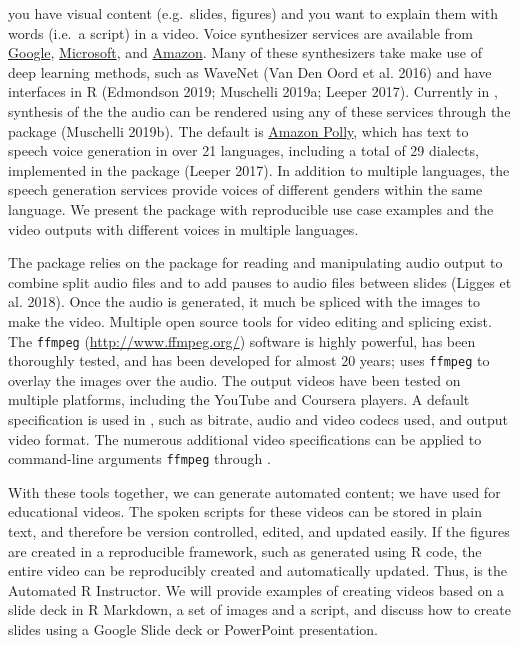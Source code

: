 you have visual content (e.g.~slides, figures) and you want to explain
them with words (i.e.~a script) in a video. Voice synthesizer services
are available from
\href{https://cloud.google.com/text-to-speech/}{Google},
\href{https://azure.microsoft.com/en-us/services/cognitive-services/text-to-speech/}{Microsoft},
and \href{https://aws.amazon.com/polly/}{Amazon}. Many of these
synthesizers take make use of deep learning methods, such as WaveNet
(Van Den Oord et al. 2016) and have interfaces in R (Edmondson 2019;
Muschelli 2019a; Leeper 2017). Currently in , synthesis of the
the audio can be rendered using any of these services through the
 package (Muschelli 2019b). The default is
\href{https://aws.amazon.com/polly/}{Amazon Polly}, which has text to
speech voice generation in over 21 languages, including a total of 29
dialects, implemented in the  package (Leeper 2017).
In addition to multiple languages, the speech generation services
provide voices of different genders within the same language. We present
the  package with reproducible use case examples and the video
outputs with different voices in multiple languages.

The  package relies on the  package for reading
and manipulating audio output to combine split audio files and to add
pauses to audio files between slides (Ligges et al. 2018). Once the
audio is generated, it much be spliced with the images to make the
video. Multiple open source tools for video editing and splicing exist.
The \texttt{ffmpeg} (\url{http://www.ffmpeg.org/}) software is highly
powerful, has been thoroughly tested, and has been developed for almost
20 years;  uses \texttt{ffmpeg} to overlay the images over the
audio. The output videos have been tested on multiple platforms,
including the YouTube and Coursera players. A default specification is
used in , such as bitrate, audio and video codecs used, and
output video format. The numerous additional video specifications can be
applied to command-line arguments \texttt{ffmpeg} through .

With these tools together, we can generate automated content; we have
used  for educational videos. The spoken scripts for these
videos can be stored in plain text, and therefore be version controlled,
edited, and updated easily. If the figures are created in a reproducible
framework, such as generated using R code, the entire video can be
reproducibly created and automatically updated. Thus,  is the
Automated R Instructor. We will provide examples of creating videos
based on a slide deck in R Markdown, a set of images and a script, and
discuss how to create slides using a Google Slide deck or PowerPoint
presentation.

